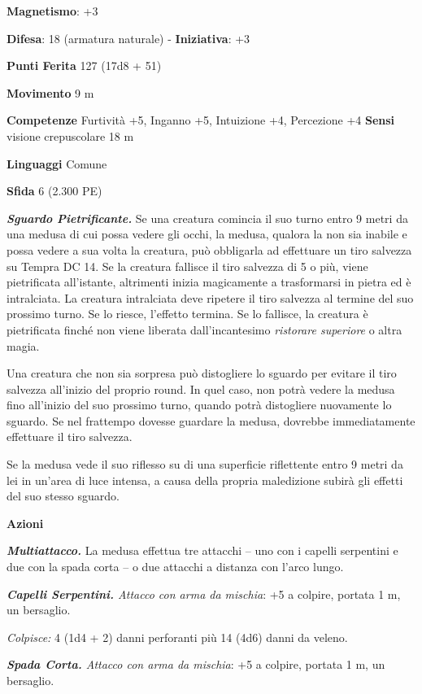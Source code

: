 \begin{multicols}{2}
\textbf{Magnetismo}: +3

\textbf{Difesa}: 18 (armatura naturale) - \textbf{Iniziativa}: +3

\textbf{Punti Ferita} 127 (17d8 + 51)

\textbf{Movimento} 9 m

\textbf{Competenze} Furtività +5, Inganno +5, Intuizione +4, Percezione +4
\textbf{Sensi} visione crepuscolare 18 m

\textbf{Linguaggi} Comune

\textbf{Sfida} 6 (2.300 PE)\smallskip

\emph{\textbf{Sguardo Pietrificante.}} Se una creatura comincia il suo
turno entro 9 metri da una medusa di cui possa vedere gli occhi, la
medusa, qualora la non sia inabile e possa vedere a sua volta la
creatura, può obbligarla ad effettuare un tiro salvezza su Tempra
DC 14. Se la creatura fallisce il tiro salvezza di 5 o più, viene
pietrificata all'istante, altrimenti inizia magicamente a trasformarsi
in pietra ed è intralciata. La creatura intralciata deve ripetere il
tiro salvezza al termine del suo prossimo turno. Se lo riesce, l'effetto
termina. Se lo fallisce, la creatura è pietrificata finché non viene
liberata dall'incantesimo \emph{ristorare superiore} o altra magia.

Una creatura che non sia sorpresa può distogliere lo sguardo per evitare
il tiro salvezza all'inizio del proprio round. In quel caso, non potrà
vedere la medusa fino all'inizio del suo prossimo turno, quando potrà
distogliere nuovamente lo sguardo. Se nel frattempo dovesse guardare la
medusa, dovrebbe immediatamente effettuare il tiro salvezza.

Se la medusa vede il suo riflesso su di una superficie riflettente entro
9 metri da lei in un'area di luce intensa, a causa della propria
maledizione subirà gli effetti del suo stesso sguardo.

\smallskip\textbf{Azioni}

\emph{\textbf{Multiattacco.}} La medusa effettua tre attacchi -- uno con
i capelli serpentini e due con la spada corta -- o due attacchi a
distanza con l'arco lungo.

\emph{\textbf{Capelli Serpentini.} Attacco con arma da mischia}: +5 a
colpire, portata 1 m, un bersaglio.

\emph{Colpisce:} 4 (1d4 + 2) danni perforanti più 14 (4d6) danni da
veleno.

\emph{\textbf{Spada Corta.} Attacco con arma da mischia}: +5 a colpire,
portata 1 m, un bersaglio.


\end{multicols}
